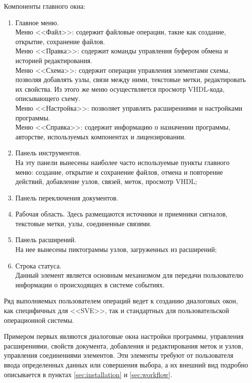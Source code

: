 Компоненты главного окна:
\begin{enumerate}[label=\arabic* -- ]
  \item Главное меню.\\
  Меню <<Файл>>: содержит файловые операции, такие как создание, открытие, сохранение файлов.\\
  Меню <<Правка>>: содержит команды управления буфером обмена и историей редактирования.\\
  Меню <<Схема>>: содержит операции управления элементами схемы, позволяя добавлять узлы, связи между ними, текстовые метки, редактировать их свойства.
  Из этого же меню осуществляется просмотр VHDL-кода, описывающего схему.\\
  Меню <<Настройка>>: позволяет управлять расширениями и настройками программы.\\
  Меню <<Справка>>: содержит информацию о назначении программы, авторстве, используемых компонентах и лицензировании.
  \item Панель инструментов.\\
  На эту панели вынесены наиболее часто используемые пункты главного меню: создание, открытие и сохранение файлов, отмена и повторение действий, добавление узлов, связей, меток, просмотр VHDL;
  \item Панель переключения документов.
  \item Рабочая область.
  Здесь размещаются источники и приемники сигналов, текстовые метки, узлы, соединенные связями.
  \item Панель расширений.\\
  На нее вынесены пиктограммы узлов, загруженных из расширений;
  \item Строка статуса.\\
  Данный элемент является основным механизмом для передачи пользователю информации о происходящих в системе событиях.
\end{enumerate}

Ряд выполняемых пользователем операций ведет к созданию диалоговых окон, как специфичных для <<SVE>>, так и стандартных для пользовательской операционной системы.

Примером первых являются диалоговые окна настройки программы, управления расширениями, свойств документа, добавления и редактирования меток и узлов, управления соединениями элементов.
Эти элементы требуют от пользователя ввода определенных данных или совершения выбора, а их внешний вид подробно описывается в пунктах \ref{sec:installation} и \ref{sec:workflow}.

